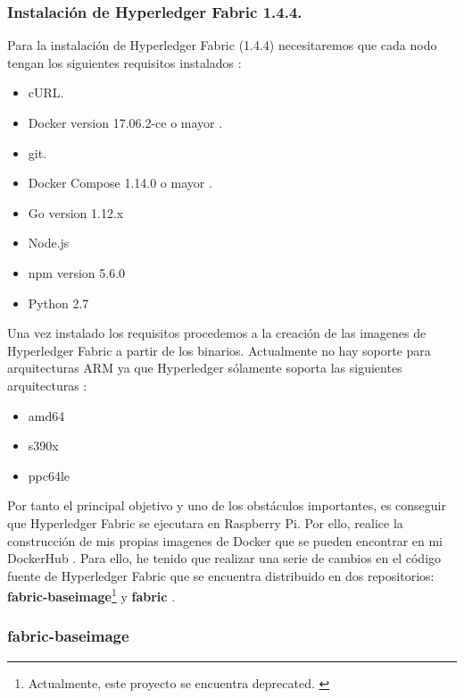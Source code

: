 \subsubsection*{Instalación de Hyperledger Fabric 1.4.4.}

Para la instalación de Hyperledger Fabric (1.4.4) necesitaremos que cada nodo tengan los siguientes requisitos instalados 
\cite{hyperledger-fabric-docs}:

\begin{itemize}
  \item cURL.
  \item Docker version 17.06.2-ce o mayor \cite{install-docker-rasp, set-up-docker-rasp}.
  \item git.
  \item Docker Compose 1.14.0 o mayor \cite{install-docker-rasp, set-up-docker-rasp}.
  \item Go version 1.12.x
  \item Node.js
  \item npm version 5.6.0
  \item Python 2.7
\end{itemize}

\vspace{5mm}

\noindent Una vez instalado los requisitos procedemos a la creación de las imagenes de Hyperledger Fabric a partir de 
los binarios. Actualmente no hay soporte para arquitecturas ARM ya que Hyperledger sólamente soporta las siguientes 
arquitecturas \cite{build-docker-images}:

\begin{itemize}
  \item amd64
  \item s390x
  \item ppc64le
\end{itemize}

\noindent Por tanto el principal objetivo y uno de los obstáculos importantes, es conseguir que Hyperledger Fabric 
se ejecutara en Raspberry Pi. Por ello, realice la construcción de mis propias imagenes de Docker que se pueden 
encontrar en mi DockerHub \cite{dockerhub}. Para ello, he tenido que realizar una serie de cambios en el código fuente
de Hyperledger Fabric que se encuentra distribuido en dos repositorios: \textbf{fabric-baseimage}\footnote{Actualmente, 
este proyecto se encuentra deprecated. \label{fnlabel}} y \textbf{fabric} \cite{fabric-baseimage, fabric}. 

\subsubsection*{fabric-baseimage}

